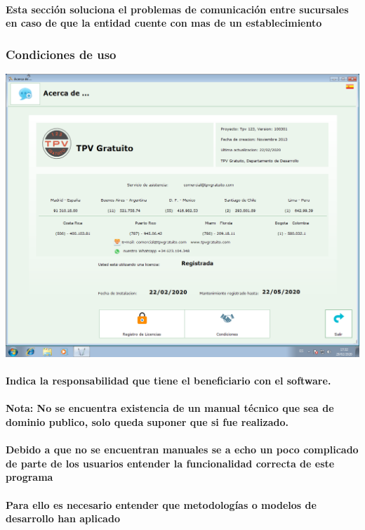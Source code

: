 \documentclass[12pt,a4paper]{article}
\begin{document}
\paragraph{Esta sección soluciona el problemas de comunicación entre sucursales en caso de que la entidad cuente con mas de un establecimiento} 

\subsubsection*{Condiciones de uso }
\includegraphics[scale=0.35]{Acerca de.png} 
\paragraph{Indica la responsabilidad que tiene el beneficiario con el software.}

\paragraph{Nota: No se encuentra existencia de un manual técnico que sea de dominio publico, solo queda suponer que si fue realizado.}
\paragraph{Debido a que no se encuentran manuales se a echo un poco complicado de parte de los usuarios entender la funcionalidad correcta de este programa }

\paragraph{Para ello es necesario entender que metodologías o modelos de desarrollo han aplicado }
\end{document}
